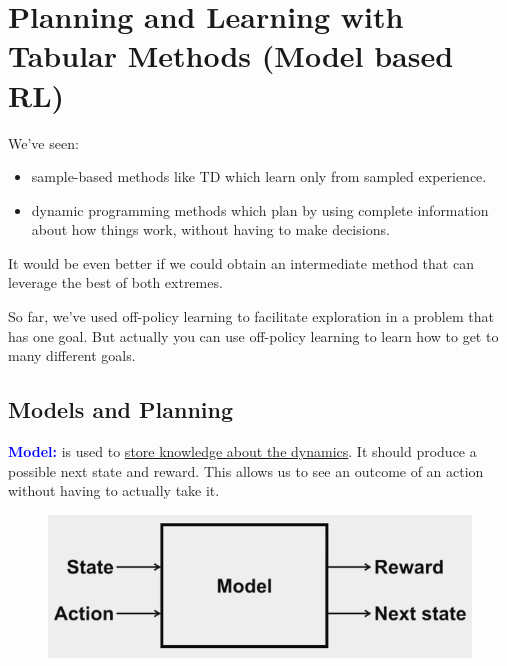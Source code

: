 \documentclass[12pt, a4paper]{article}
\let\stdsection\section
\renewcommand\section{\newpage\stdsection} %
\begin{document}
\section{Planning and Learning with Tabular Methods (Model based RL)}\label{planning-and-learning-with-tabular-methods}

We've seen:
\begin{itemize}
  \item sample-based methods like TD which learn only from sampled experience.
  \item dynamic programming methods which plan by using complete information about how things work, without having to make decisions.
\end{itemize}
It would be even better if we could obtain an intermediate method that can leverage the best of both extremes.

So far, we’ve used off-policy learning to facilitate exploration in a problem that has one goal. But actually you can use off-policy learning to learn how to get to many different goals.






\subsection{Models and Planning}\label{models-and-planning}


\textbf{\textcolor{blue}{Model:}} is used to \uline{store knowledge about the dynamics}. It should produce a possible next state and reward. This allows us to see an outcome of an action without having to actually take it.

\begin{figure}[H]
  \centering
    \includegraphics[width=0.6\columnwidth]{images/model.png}
    \label{fig:model}
\end{figure}
\end{document}

